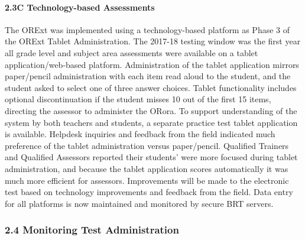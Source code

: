 \documentclass[]{article}
\let\oldparagraph\paragraph
\renewcommand{\paragraph}[1]{\oldparagraph{#1}\mbox{}}
\begin{document}
\hypertarget{c-technology-based-assessments}{%
\paragraph{2.3C Technology-based
Assessments}\label{c-technology-based-assessments}}

The ORExt was implemented using a technology-based platform as Phase 3
of the ORExt Tablet Administration. The 2017-18 testing window was the
first year all grade level and subject area assessments were available
on a tablet application/web-based platform. Administration of the tablet
application mirrors paper/pencil administration with each item read
aloud to the student, and the student asked to select one of three
answer choices. Tablet functionality includes optional discontinuation
if the student misses 10 out of the first 15 items, directing the
assessor to administer the ORora. To support understanding of the system
by both teachers and students, a separate practice test tablet
application is available. Helpdesk inquiries and feedback from the field
indicated much preference of the tablet administration versus
paper/pencil. Qualified Trainers and Qualified Assessors reported their
students' were more focused during tablet administration, and because
the tablet application scores automatically it was much more efficient
for assessors. Improvements will be made to the electronic test based on
technology improvements and feedback from the field. Data entry for all
platforms is now maintained and monitored by secure BRT servers.

\hypertarget{monitoring-test-administration}{%
\subsubsection{2.4 Monitoring Test
Administration}\label{monitoring-test-administration}}
\end{document}
